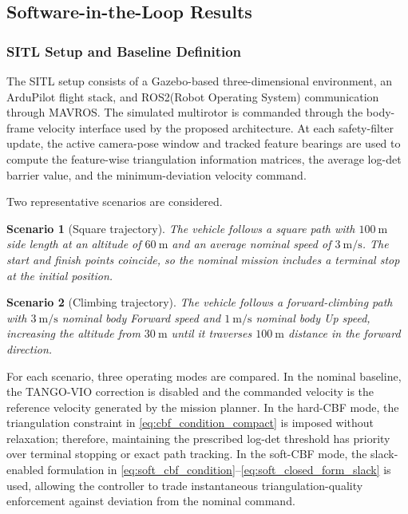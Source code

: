 \documentclass[journal]{IEEEtran}
\newtheorem{scenario}{Scenario}[section]
\begin{document}
\subsection{Software-in-the-Loop Results}
\label{SITL}

\subsubsection{SITL Setup and Baseline Definition}

The SITL setup consists of a Gazebo-based three-dimensional environment, an ArduPilot flight stack, and ROS2(Robot Operating System) communication through MAVROS. The simulated multirotor is commanded through the body-frame velocity interface used by the proposed architecture. At each safety-filter update, the active camera-pose window and tracked feature bearings are used to compute the feature-wise triangulation information matrices, the average log-det barrier value, and the minimum-deviation velocity command.

Two representative scenarios are considered.

\begin{scenario}[Square trajectory]
    The vehicle follows a square path with $100~\mathrm{m}$ side length at an altitude of $60~\mathrm{m}$ and an average nominal speed of $3~\mathrm{m/s}$. The start and finish points coincide, so the nominal mission includes a terminal stop at the initial position.
\end{scenario}

\begin{scenario}[Climbing trajectory]
    The vehicle follows a forward-climbing path with $3~\mathrm{m/s}$ nominal body Forward speed and $1~\mathrm{m/s}$ nominal body Up speed, increasing the altitude from $30~\mathrm{m}$ until it traverses $100~\mathrm{m}$ distance in the forward direction.
\end{scenario}

For each scenario, three operating modes are compared. In the nominal baseline, the TANGO-VIO correction is disabled and the commanded velocity is the reference velocity generated by the mission planner. In the hard-CBF mode, the triangulation constraint in \eqref{eq:cbf_condition_compact} is imposed without relaxation; therefore, maintaining the prescribed log-det threshold has priority over terminal stopping or exact path tracking. In the soft-CBF mode, the slack-enabled formulation in \eqref{eq:soft_cbf_condition}--\eqref{eq:soft_closed_form_slack} is used, allowing the controller to trade instantaneous triangulation-quality enforcement against deviation from the nominal command.
\end{document}
